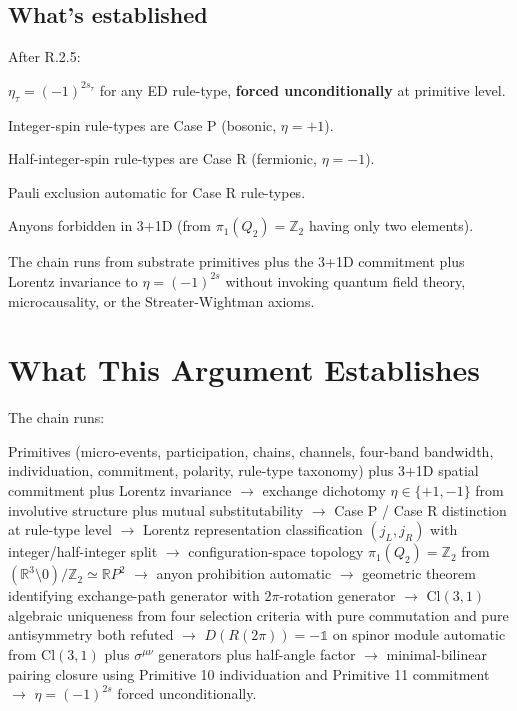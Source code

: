 \documentclass[11pt,a4paper]{article}
\begin{document}
\subsection{What's established}

After R.2.5:

$\eta_\tau = (-1)^{2s_\tau}$ for any ED rule-type, \textbf{forced unconditionally} at primitive level.

Integer-spin rule-types are Case P (bosonic, $\eta = +1$).

Half-integer-spin rule-types are Case R (fermionic, $\eta = -1$).

Pauli exclusion automatic for Case R rule-types.

Anyons forbidden in 3+1D (from $\pi_1(Q_2) = \mathbb{Z}_2$ having only two elements).

The chain runs from substrate primitives plus the 3+1D commitment plus Lorentz invariance to $\eta = (-1)^{2s}$ without invoking quantum field theory, microcausality, or the Streater-Wightman axioms.

\section{What This Argument Establishes}

The chain runs:

Primitives (micro-events, participation, chains, channels, four-band bandwidth, individuation, commitment, polarity, rule-type taxonomy) plus 3+1D spatial commitment plus Lorentz invariance $\to$ exchange dichotomy $\eta \in \{+1, -1\}$ from involutive structure plus mutual substitutability $\to$ Case P / Case R distinction at rule-type level $\to$ Lorentz representation classification $(j_L, j_R)$ with integer/half-integer split $\to$ configuration-space topology $\pi_1(Q_2) = \mathbb{Z}_2$ from $(\mathbb{R}^{3}\setminus 0)/\mathbb{Z}_2 \simeq \mathbb{R}P^{2}$ $\to$ anyon prohibition automatic $\to$ geometric theorem identifying exchange-path generator with $2\pi$-rotation generator $\to$ $\mathrm{Cl}(3,1)$ algebraic uniqueness from four selection criteria with pure commutation and pure antisymmetry both refuted $\to$ $D(R(2\pi)) = -\mathbb{1}$ on spinor module automatic from $\mathrm{Cl}(3,1)$ plus $\sigma^{\mu\nu}$ generators plus half-angle factor $\to$ minimal-bilinear pairing closure using Primitive 10 individuation and Primitive 11 commitment $\to$ $\eta = (-1)^{2s}$ forced unconditionally.
\end{document}
